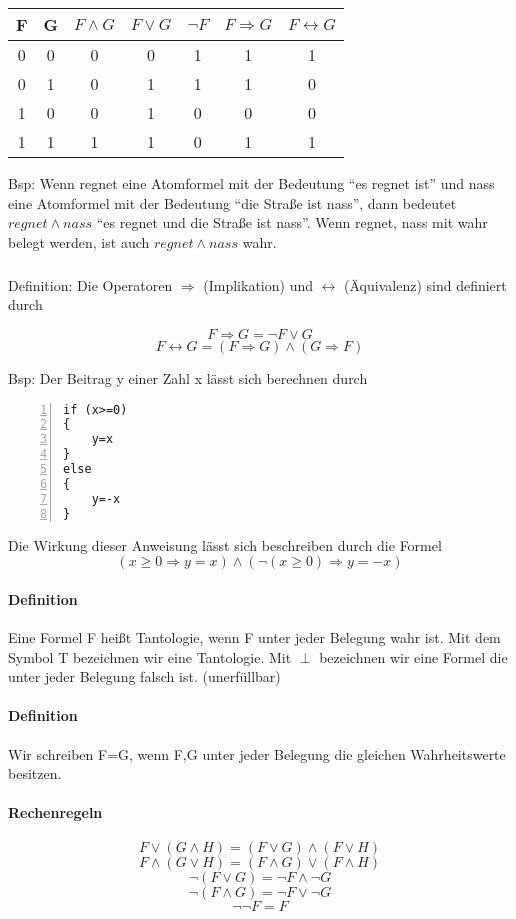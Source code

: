 \documentclass[a4paper]{scrartcl}
\begin{document}
\begin{tabular}{c|c|c|c|c|c|c}

F & G & $F \wedge G$ &$ F \vee G$&$\neg F$ & $F \Rightarrow G$ & $F \leftrightarrow G$ \\ \hline
0&0&0&0&1&1&1 \\
0&1&0&1&1&1&0 \\
1&0&0&1&0&0&0 \\
1&1&1&1&0 &1&1\\

\end{tabular}

Bsp: Wenn regnet eine Atomformel mit der Bedeutung "`es regnet ist"' und nass eine Atomformel mit der Bedeutung "`die Straße ist nass"', dann bedeutet $regnet \wedge nass$  "`es regnet und die Straße ist nass"'.
Wenn regnet, nass mit wahr belegt werden, ist auch $regnet \wedge nass$ wahr.
\subparagraph{}
Definition: Die Operatoren $\Rightarrow$ (Implikation) und $\leftrightarrow$ (Äquivalenz) sind definiert durch

\[F \Rightarrow G = \neg F \vee G\]
\[F \leftrightarrow G = ( F \Rightarrow G ) \wedge ( G \Rightarrow F)\]

Bsp: Der Beitrag y einer Zahl x lässt sich berechnen durch

\begin{lstlisting}[numbers=left, tabsize=4, style=customc]
if (x>=0)
{
	y=x
}
else
{
	y=-x
}
\end{lstlisting}

Die Wirkung dieser Anweisung lässt sich beschreiben durch die Formel
\[(x\geq 0 \Rightarrow y = x) \wedge (\neg (x\geq 0)\Rightarrow y=-x)\]

\paragraph{Definition}
Eine Formel F heißt Tantologie, wenn F unter jeder Belegung wahr ist. Mit dem Symbol T bezeichnen wir eine Tantologie.
Mit $\perp$ bezeichnen wir eine Formel die unter jeder Belegung falsch ist. (unerfüllbar)
\paragraph{Definition}
Wir schreiben F=G, wenn F,G unter jeder Belegung die gleichen Wahrheitswerte besitzen.
\paragraph{Rechenregeln}
\[F\vee (G\wedge H)= (F\vee G)\wedge(F\vee H)\]
\[F\wedge (G\vee H) = (F\wedge G)\vee (F\wedge H)\]
\[\neg (F\vee G) = \neg F \wedge \neg G\]
\[\neg (F \wedge G) = \neg F \vee \neg G\]
\[\neg \neg F = F\]
\end{document}
